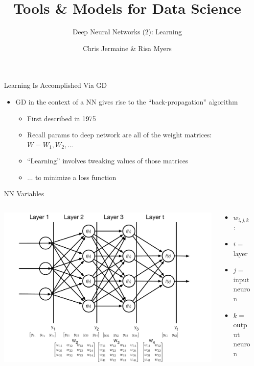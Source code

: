 \documentclass[aspectratio=169]{beamer}
\title[]
{ Tools \& Models for Data Science}
\subtitle{Deep Neural Networks (2): Learning}
\author[]{Chris Jermaine \& Risa Myers}
\institute
{
  Rice University 
}
\date[]{}
\begin{document}
\begin{frame}
 \titlepage
\end{frame}

\begin{frame}{Learning Is Accomplished Via GD}

\begin{itemize}
	\item GD in the context of a NN gives rise to the ``back-propagation'' algorithm
	\begin{itemize}
	\item First described in 1975
	\item Recall params to deep network are all of the weight matrices: $W = W_1, W_2, ...$
	\item ``Learning'' involves tweaking values of those matrices
	\item $\ldots$ to minimize a loss function
	\end{itemize}
\end{itemize}
\end{frame}
\begin{frame}{NN Variables}

\begin{columns}
\begin{column}{0.75\textwidth}
\includegraphics[width=.85\textwidth]{lectFF/nnEval.pdf}
\end{column}
\begin{column}{0.35\textwidth}
\begin{itemize}
\item $w_{i,j,k}$:
\item $i = $ layer
\item $j = $ input neuron
\item $k = $ output neuron
\end{itemize}
\end{column}
\end{columns}
\end{frame}
\end{document}
